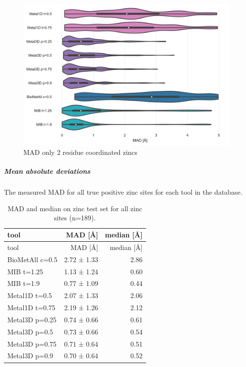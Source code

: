 \documentclass[  ASAPversion,
  ,
  9pt]{elife}
\newenvironment{fignos:tagged-figure}[1][]{
  \let\oldthefigure\thefigure
  \let\oldtheHfigure\theHfigure
  \renewcommand{\thefigure}{#1}
  \renewcommand{\theHfigure}{#1}
}{
  \let\thefigure\oldthefigure
  \let\theHfigure\oldtheHfigure
  \addtocounter{figure}{-1}
}
\newenvironment{tablenos:tagged-table}[1][]{
  \let\oldthetable\thetable
  \let\oldtheHtable\theHtable
  \renewcommand{\thetable}{#1}
  \renewcommand{\theHtable}{#1}
}{
  \let\thetable\oldthetable
  \let\theHtable\oldtheHtable
  \addtocounter{table}{-1}
}
\begin{document}
\begin{fignos:tagged-figure}[S7]

\begin{figure}
\hypertarget{fig:madonlyGoodZnmetal3d}{%
\centering
\includegraphics{images/mad_violin_0.5_2+.jpg}
\caption{MAD only 2 residue coordinated zincs}\label{fig:madonlyGoodZnmetal3d}
}
\end{figure}

\end{fignos:tagged-figure}

\hypertarget{mean-absolute-deviations}{%
\subparagraph{Mean absolute deviations}\label{mean-absolute-deviations}}

The measured MAD for all true positive zinc sites for each tool in the database.

\begin{tablenos:tagged-table}[S3]

\begin{longtable}[]{@{}lrr@{}}
\caption{MAD and median on zinc test set for all zinc sites (n=189). \label{tbl:compmadmediantest}}\tabularnewline
\toprule
tool & MAD {[}Å{]} & median {[}Å{]}\tabularnewline
\midrule
\endfirsthead
\toprule
tool & MAD {[}Å{]} & median {[}Å{]}\tabularnewline
\midrule
\endhead
BioMetAll c=0.5 & 2.72 ± 1.33 & 2.86\tabularnewline
MIB t=1.25 & 1.13 ± 1.24 & 0.60\tabularnewline
MIB t=1.9 & 0.77 ± 1.09 & 0.44\tabularnewline
Metal1D t=0.5 & 2.07 ± 1.33 & 2.06\tabularnewline
Metal1D t=0.75 & 2.19 ± 1.26 & 2.12\tabularnewline
Metal3D p=0.25 & 0.74 ± 0.66 & 0.61\tabularnewline
Metal3D p=0.5 & 0.73 ± 0.66 & 0.54\tabularnewline
Metal3D p=0.75 & 0.71 ± 0.64 & 0.51\tabularnewline
Metal3D p=0.9 & 0.70 ± 0.64 & 0.52\tabularnewline
\bottomrule
\end{longtable}

\end{tablenos:tagged-table}
\end{document}
